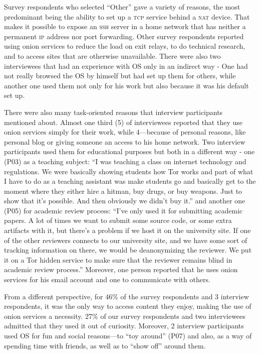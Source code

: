 Survey respondents who selected ``Other'' gave a variety of reasons, the most
predominant being the ability to set up a \textsc{tcp} service behind a
\textsc{nat} device.  That makes it possible to expose an \textsc{ssh} server in
a home network that has neither a permanent \textsc{ip} address nor port
forwarding.  Other survey respondents reported using onion services to reduce
the load on exit relays, to do technical research, and to access sites that are
otherwise unavailable. There were also two interviewees that had an experience
with OS only in an indirect way - One had not really browsed the OS by himself
but had set up them for others, while another one used them not only for his
work but also because it was his default set up.

There were also many task-oriented reasons that interview participants mentioned
about. Almost one third (5) of interviewees reported that they use onion
services simply for their work, while 4---because of personal reasons, like
personal blog or giving someone an access to his home network. Two interview
participants used them for educational purposes but both in a different way -
one (P03) as a teaching subject: ``I was teaching a class on internet technology
and regulations. We were basically showing students how Tor works and part of
what I have to do as a teaching assistant was make students go and basically get
to the moment where they either hire a hitman, buy drugs, or buy weapons. Just
to show that it's possible. And then obviously we didn't buy it.'' and another
one (P05) for academic review process: ``I've only used it for submitting
academic papers. A lot of times we want to submit some source code, or some
extra artifacts with it, but there's a problem if we host it on the university
site. If one of the other reviewers connects to our university site, and we have
some sort of tracking information on there, we would be deanonymizing the
reviewer. We put it on a Tor hidden service to make sure that the reviewer
remains blind in academic review process.'' Moreover, one person reported that
he uses onion services for his email account and one to communicate with others.

From a different perspective, for 46\% of the survey respondents and 3 interview
respondents, it was the only way to access content they enjoy, making the use of
onion services a necessity. 27\% of our survey respondents and two interviewees
admitted that they used it out of curiosity. Moreover, 2 interview participants
used OS for fun and social reasons---to ``toy around'' (P07) and also, as a way
of spending time with friends, as well as to ``show off'' around them.


